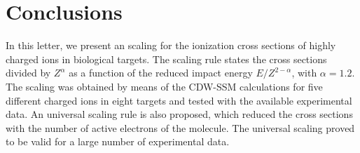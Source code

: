 \documentclass[10pt,showpacs,showkeys,twocolumn]{revtex4}
\begin{document}
\section{Conclusions}
In this letter, we present an scaling for the ionization cross sections of highly charged ions in biological targets. The scaling rule states the cross sections divided by $Z^{\alpha}$ as a function of the reduced impact energy $E/Z^{2-\alpha}$, with $\alpha=1.2$. The scaling was obtained by means of the CDW-SSM calculations for five different charged ions in eight targets and tested with the available experimental data. An universal scaling rule  is also proposed, which reduced the cross sections with the number of active electrons of the molecule. The universal scaling proved to be valid for a large number of experimental data.

\bigskip
\end{document}
